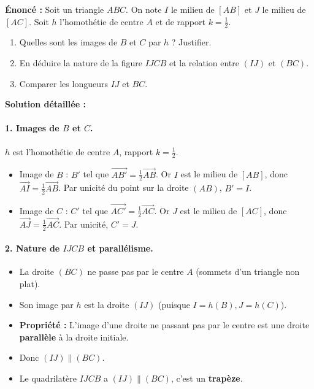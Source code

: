 \documentclass[11pt]{article}
\begin{document}
\begin{exoresolu}
\textbf{Énoncé :} Soit un triangle $ABC$. On note $I$ le milieu de $[AB]$ et $J$ le milieu de $[AC]$.
Soit $h$ l'homothétie de centre $A$ et de rapport $k = \frac{1}{2}$.
\begin{enumerate}
    \item Quelles sont les images de $B$ et $C$ par $h$ ? Justifier.
    \item En déduire la nature de la figure $IJCB$ et la relation entre $(IJ)$ et $(BC)$.
    \item Comparer les longueurs $IJ$ et $BC$.
\end{enumerate}
\tcblower
\textbf{Solution détaillée :}
\paragraph{1. Images de $B$ et $C$.}
$h$ est l'homothétie de centre $A$, rapport $k = \frac{1}{2}$.
\begin{itemize}
    \item Image de $B$ : $B'$ tel que $\overrightarrow{AB'} = \frac{1}{2}\overrightarrow{AB}$.
    Or $I$ est le milieu de $[AB]$, donc $\overrightarrow{AI} = \frac{1}{2}\overrightarrow{AB}$.
    Par unicité du point sur la droite $(AB)$, \textbf{$B' = I$}.
    \item Image de $C$ : $C'$ tel que $\overrightarrow{AC'} = \frac{1}{2}\overrightarrow{AC}$.
    Or $J$ est le milieu de $[AC]$, donc $\overrightarrow{AJ} = \frac{1}{2}\overrightarrow{AC}$.
    Par unicité, \textbf{$C' = J$}.
\end{itemize}
\paragraph{2. Nature de $IJCB$ et parallélisme.}
\begin{itemize}
    \item La droite $(BC)$ ne passe pas par le centre $A$ (sommets d'un triangle non plat).
    \item Son image par $h$ est la droite $(IJ)$ (puisque $I=h(B), J=h(C)$).
    \item \textbf{Propriété :} L'image d'une droite ne passant pas par le centre est une droite \textbf{parallèle} à la droite initiale.
    \item Donc \textbf{$(IJ) \parallel (BC)$}.
    \item Le quadrilatère $IJCB$ a $(IJ) \parallel (BC)$, c'est un \textbf{trapèze}.
\end{itemize}

\end{exoresolu}
\end{document}
